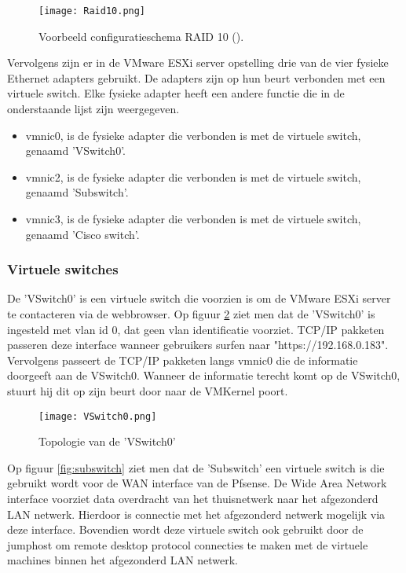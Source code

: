 \begin{figure}[H]
	\centering
	\texttt{[image: Raid10.png]}
	\caption{Voorbeeld configuratieschema RAID 10 (\cite{Raid10}).}
	\label{fig:Raid10}
\end{figure}
\newpage
Vervolgens zijn er in de VMware ESXi server opstelling drie van de vier fysieke Ethernet adapters gebruikt. De adapters zijn op hun beurt verbonden met een virtuele switch. Elke fysieke adapter heeft een andere functie die in de onderstaande lijst zijn weergegeven. 

\begin{itemize}
	\item vmnic0, is de fysieke adapter die verbonden is met de virtuele switch, genaamd 'VSwitch0'.
	\item vmnic2, is de fysieke adapter die verbonden is met de virtuele switch, genaamd 'Sub\textunderscore switch'.
	\item vmnic3, is de fysieke adapter die verbonden is met de virtuele switch, genaamd 'Cisco \textunderscore switch'.
\end{itemize}

\subsubsection{Virtuele switches}
\newline
De 'VSwitch0' is een virtuele switch die voorzien is om de VMware ESXi server te contacteren via de webbrowser. Op figuur \ref{fig:Vswitch0} ziet men dat de 'VSwitch0' is ingesteld met vlan id 0, dat geen vlan identificatie voorziet. 
\newline
\newline
TCP/IP pakketen passeren deze interface wanneer gebruikers surfen naar "https://192.168.0.183". Vervolgens passeert de TCP/IP pakketen langs vmnic0 die de informatie doorgeeft aan de VSwitch0. Wanneer de informatie terecht komt op de VSwitch0, stuurt hij dit op zijn beurt door naar de VMKernel poort.


\begin{figure}[H]
	\centering
	\texttt{[image: VSwitch0.png]}
	\caption{Topologie van de 'VSwitch0'}
	\label{fig:Vswitch0}
\end{figure}
\newpage
{}
\newline
Op figuur \ref{fig:subswitch} ziet men dat de 'Sub\textunderscore switch' een virtuele switch is die gebruikt wordt voor de WAN interface van de Pfsense. De Wide Area Network interface voorziet data overdracht van het thuisnetwerk naar het afgezonderd LAN netwerk. Hierdoor is connectie met het afgezonderd netwerk mogelijk via deze interface. Bovendien wordt deze virtuele switch ook gebruikt door de jumphost om remote desktop protocol connecties te maken met de virtuele machines binnen het afgezonderd LAN netwerk. 

